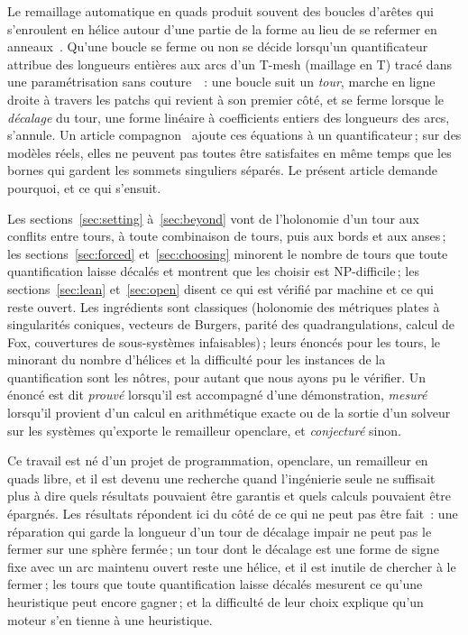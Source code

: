 \documentclass[11pt,a4paper]{article}
\begin{document}
Le remaillage automatique en quads produit souvent des boucles d'arêtes qui
s'enroulent en hélice autour d'une partie de la forme au lieu de se refermer
en anneaux~\cite{bommes2011structure}. Qu'une boucle se ferme ou non se décide
lorsqu'un quantificateur attribue des longueurs entières aux arcs d'un T-mesh
(maillage en T) tracé dans une paramétrisation sans
couture~\cite{campen2015qgp,lyon2021constrained,heistermann2023bimdf}~: une
boucle suit un \emph{tour}, marche en ligne droite à travers les patchs qui
revient à son premier côté, et se ferme lorsque le \emph{décalage} du tour,
une forme linéaire à coefficients entiers des longueurs des arcs, s'annule. Un
article compagnon~\cite{gardent2026loops} ajoute ces équations à un
quantificateur\,; sur des modèles réels, elles ne peuvent pas toutes être
satisfaites en même temps que les bornes qui gardent les sommets singuliers
séparés. Le présent article demande pourquoi, et ce qui s'ensuit.

Les sections~\ref{sec:setting} à~\ref{sec:beyond} vont de l'holonomie d'un
tour aux conflits entre tours, à toute combinaison de tours, puis aux bords et
aux anses\,; les sections~\ref{sec:forced} et~\ref{sec:choosing} minorent le
nombre de tours que toute quantification laisse décalés et montrent que les
choisir est NP-difficile\,; les sections~\ref{sec:lean} et~\ref{sec:open}
disent ce qui est vérifié par machine et ce qui reste ouvert. Les ingrédients
sont classiques (holonomie des métriques plates à singularités coniques,
vecteurs de Burgers, parité des quadrangulations, calcul de Fox, couvertures
de sous-systèmes infaisables)\,; leurs énoncés pour les tours, le minorant du
nombre d'hélices et la difficulté pour les instances de la quantification sont
les nôtres, pour autant que nous ayons pu le vérifier. Un énoncé est dit
\emph{prouvé} lorsqu'il est accompagné d'une démonstration, \emph{mesuré}
lorsqu'il provient d'un calcul en arithmétique exacte ou de la sortie d'un
solveur sur les systèmes qu'exporte le remailleur openclare, et
\emph{conjecturé} sinon.

Ce travail est né d'un projet de programmation, openclare, un remailleur en
quads libre, et il est devenu une recherche quand l'ingénierie seule ne
suffisait plus à dire quels résultats pouvaient être garantis et quels calculs
pouvaient être épargnés. Les résultats répondent ici du côté de ce qui ne peut
pas être fait~: une réparation qui garde la longueur d'un tour de décalage
impair ne peut pas le fermer sur une sphère fermée\,; un tour dont le décalage
est une forme de signe fixe avec un arc maintenu ouvert reste une hélice, et
il est inutile de chercher à le fermer\,; les tours que toute quantification
laisse décalés mesurent ce qu'une heuristique peut encore gagner\,; et la
difficulté de leur choix explique qu'un moteur s'en tienne à une heuristique.
\end{document}
